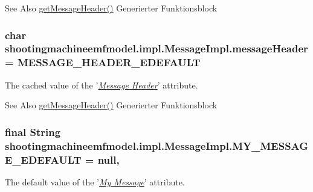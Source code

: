 \begin{DoxySeeAlso}{See Also}
\hyperlink{classshootingmachineemfmodel_1_1impl_1_1_message_impl_a367b64d6b4db36b1597ab4be46e6b5ee}{get\-Message\-Header()} Generierter Funktionsblock  
\end{DoxySeeAlso}
\hypertarget{classshootingmachineemfmodel_1_1impl_1_1_message_impl_ac3933f6c5dc6ce4bc2a536817382faff}{
\subsubsection[{message\-Header}]{\setlength{\rightskip}{0pt plus 5cm}char shootingmachineemfmodel.\-impl.\-Message\-Impl.\-message\-Header = {\bf M\-E\-S\-S\-A\-G\-E\-\_\-\-H\-E\-A\-D\-E\-R\-\_\-\-E\-D\-E\-F\-A\-U\-L\-T}\hspace{0.3cm}{\ttfamily [protected]}}}\label{classshootingmachineemfmodel_1_1impl_1_1_message_impl_ac3933f6c5dc6ce4bc2a536817382faff}
The cached value of the '\hyperlink{classshootingmachineemfmodel_1_1impl_1_1_message_impl_a367b64d6b4db36b1597ab4be46e6b5ee}{{\itshape Message Header}}' attribute.

\begin{DoxySeeAlso}{See Also}
\hyperlink{classshootingmachineemfmodel_1_1impl_1_1_message_impl_a367b64d6b4db36b1597ab4be46e6b5ee}{get\-Message\-Header()} Generierter Funktionsblock  
\end{DoxySeeAlso}
\hypertarget{classshootingmachineemfmodel_1_1impl_1_1_message_impl_a90221c62d997569d3a4a57c5a5238633}{
\subsubsection[{M\-Y\-\_\-\-M\-E\-S\-S\-A\-G\-E\-\_\-\-E\-D\-E\-F\-A\-U\-L\-T}]{\setlength{\rightskip}{0pt plus 5cm}final String shootingmachineemfmodel.\-impl.\-Message\-Impl.\-M\-Y\-\_\-\-M\-E\-S\-S\-A\-G\-E\-\_\-\-E\-D\-E\-F\-A\-U\-L\-T = null\hspace{0.3cm}{\ttfamily [static]}, {\ttfamily [protected]}}}\label{classshootingmachineemfmodel_1_1impl_1_1_message_impl_a90221c62d997569d3a4a57c5a5238633}
The default value of the '\hyperlink{classshootingmachineemfmodel_1_1impl_1_1_message_impl_a73e1956a1f5c8f4cd5d1c34c94cd6373}{{\itshape My Message}}' attribute.


